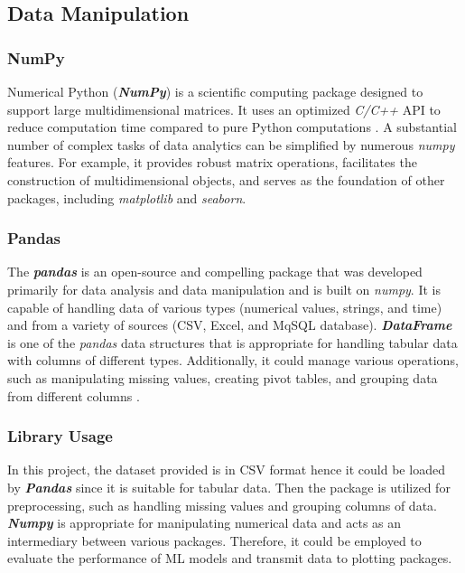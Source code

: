 \documentclass[12pt,twoside]{report}
\begin{document}
\subsection{Data Manipulation}
\subsubsection{NumPy}
Numerical Python (\textit{\textbf{NumPy}}) is a scientific computing package designed to support large multidimensional matrices. It uses an optimized \textit{C/C++} API to reduce computation time compared to pure Python computations \citep{RN6}. A substantial number of complex tasks of data analytics can be simplified by numerous \textit{numpy} features. For example, it provides robust matrix operations, facilitates the construction of multidimensional objects, and serves as the foundation of other packages, including \textit{matplotlib} and \textit{seaborn}.

\subsubsection{Pandas}
The \textbf{\textit{pandas}} is an open-source and compelling package that was developed primarily for data analysis and data manipulation and is built on \textit{numpy}. It is capable of handling data of various types (numerical values, strings, and time) and from a variety of sources (CSV, Excel, and MqSQL database). \textbf{\textit{DataFrame}} is one of the \textit{pandas} data structures that is appropriate for handling tabular data with columns of different types. Additionally, it could manage various operations, such as manipulating missing values, creating pivot tables, and grouping data from different columns \citep{RN4}. 

\subsubsection{Library Usage}
In this project, the dataset provided is in CSV format hence it could be loaded by \textbf{\textit{Pandas}} since it is suitable for tabular data. Then the package is utilized for preprocessing, such as handling missing values and grouping columns of data. 
\\

\textit{\textbf{Numpy}} is appropriate for manipulating numerical data and acts as an intermediary between various packages. Therefore, it could be employed to evaluate the performance of ML models and transmit data to plotting packages. 
\end{document}
